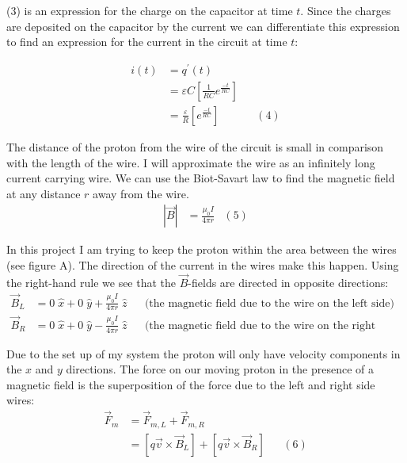 \documentclass[11pt]{article}
\begin{document}
\vspace{.2in}
\noindent (3) is an expression for the charge on the capacitor at time $t$. Since the charges are deposited on the capacitor by the current we can differentiate this expression to find an expression for the current in the circuit at time $t$: 

\begin{align*}
i(t)&=q^{'}(t)\\&=\varepsilon C\left[\frac{1}{RC}e^{\frac{-t}{RC}}\right]\\&=\frac{\varepsilon}{R}\left[e^{\frac{-t}{RC}}\right]&&(4)
\end{align*}

\vspace{.2in}

\noindent The distance of the proton from the wire of the circuit is small in comparison with the length of the wire. I will approximate the wire as an infinitely long current carrying wire. We can use the Biot-Savart law to find the magnetic field at any distance $r$ away from the wire. 
\begin{align*}
\left|\vec{B}\right|&=\frac{\mu_0I}{4\pi r}&(5)
\end{align*}

\vspace{.2in}

\noindent In this project I am trying to keep the proton within the area between the wires (see figure A). The direction of the current in the wires make this happen. Using the right-hand rule we see that the $\vec{B}$-fields are directed in opposite directions:
\begin{align*}
\vec{B}_L&=0\;\hat{x}+0\;\hat{y}+\frac{\mu_0I}{4\pi r}\;\hat{z}&&\text{(the magnetic field due to the wire on the left side)}\\\vec{B}_R&=0\;\hat{x}+0\;\hat{y}-\frac{\mu_0I}{4\pi r}\;\hat{z}&&\text{(the magnetic field due to the wire on the right side)}
\end{align*}

\vspace{.2in}

\noindent Due to the set up of my system the proton will only have velocity components in the $x$ and $y$ directions. The force on our moving proton in the presence of a magnetic field is the superposition of the force due to the left and right side wires:
\begin{align*}
\vec{F}_m&=\vec{F}_{m,L}+\vec{F}_{m,R}\\&=\left[q\vec{v}\times\vec{B}_L\right]+\left[q\vec{v}\times\vec{B}_R\right]&&(6)
\end{align*}
\end{document}
